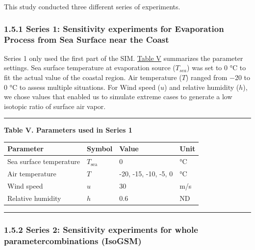 \documentclass[11pt]{article}
\begin{document}
This study conducted three different series of experiments.

\subsubsection{1.5.1 Series 1: Sensitivity experiments for Evaporation Process from Sea Surface near
the
Coast}\label{series-1-sensitivity-experiments-for-evaporation-process-from-sea-surface-near-the-coast}

Series 1 only used the first part of the SIM. \hyperref[Table-V]{Table V} summarizes the parameter
settings. Sea surface temperature at evaporation source (\(T_{sea}\)) was set to 0 °C to fit the
actual value of the coastal region. Air temperature (\(T\)) ranged from −20 to 0 °C to assess
multiple situations. For Wind speed (\(u\)) and relative humidity (\(h\)), we chose values that
enabled us to simulate extreme cases to generate a low isotopic ratio of surface air vapor.

\begin{center}\rule{0.5\linewidth}{0.5pt}\end{center}

\textbf{Table V. Parameters used in Series 1}

\begin{longtable}[]{@{}llll@{}}
\toprule\noalign{}
Parameter & Symbol & Value & Unit \\
\midrule\noalign{}
\endhead
\bottomrule\noalign{}
\endlastfoot
Sea surface temperature & \(T_{\mathrm{sea}}\) & 0 & °C \\
Air temperature & \(T\) & -20, -15, -10, -5, 0 & °C \\
Wind speed & \(u\) & 30 & m/s \\
Relative humidity & \(h\) & 0.6 & ND \\
\end{longtable}

\begin{center}\rule{0.5\linewidth}{0.5pt}\end{center}

\subsubsection{1.5.2 Series 2: Sensitivity experiments for whole parametercombinations
(IsoGSM)}\label{series-2-sensitivity-experiments-for-whole-parametercombinations-isogsm}
\end{document}
